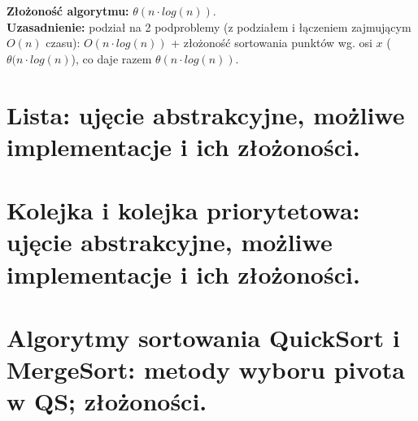 \documentclass[12pt]{article}
\begin{document}
\begin{enumerate}
\begin{enumerate}
\begin{center}

                \end{center}
            \end{enumerate}
        \end{enumerate}
        \[\] 
        \textbf{Złożoność algorytmu:} $\theta(n \cdot log(n))$. \[\] 
        \textbf{Uzasadnienie:} podział na 2 podproblemy (z podziałem i łączeniem zajmującym 
        $O(n)$ czasu): $O(n \cdot log(n))$ + złożoność sortowania punktów wg. osi $x$ 
        ($\theta(n \cdot log(n)$), co daje razem $\theta(n \cdot log(n))$.
    \newpage

    \section{Lista: ujęcie abstrakcyjne, możliwe implementacje i ich złożoności.}
    \section{Kolejka i kolejka priorytetowa: ujęcie abstrakcyjne, możliwe implementacje i ich złożoności.}

    \newpage

    \section{Algorytmy sortowania QuickSort i MergeSort: metody wyboru pivota w QS; złożoności.}

    \newpage
\end{document}
